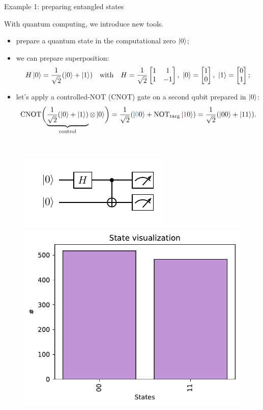 \documentclass[aspectratio=169, 8pt, xcolor={svgnames}, hyperref={linkcolor=black}]{beamer}
\begin{document}
\begin{frame}{Example 1: preparing entangled states}

With quantum computing, we introduce new tools.
\begin{itemize}[noitemsep]
\item[\faRocket] prepare a quantum state in the computational zero $\ket{0}$;
\item[\faSliders] we can prepare superposition: 
$$H\ket{0} = \frac{1}{\sqrt{2}}(\ket{0} + \ket{1})  \quad \text{with} \quad H = \frac{1}{\sqrt{2}}
\begin{bmatrix} 1 & 1 \\ 1 & -1 \end{bmatrix},\,\, \ket{0}=\begin{bmatrix} 1 \\ 0 
\end{bmatrix},\,\,\ket{1}=\begin{bmatrix} 0 \\ 1 \end{bmatrix};$$
\item[\faShareAlt] let's apply a controlled-NOT (CNOT) gate on a second qubit prepared in $\ket{0}$:
$$ \text{CNOT} \biggl( \underbrace{\frac{1}{\sqrt{2}}(\ket{0} + \ket{1})}_{\text{control}}\otimes 
\ket{0} \biggr) = \frac{1}{\sqrt{2}}(\ket{\textcolor{bleudefrance}{0}0} + 
\text{NOT}_{\rm targ}\ket{\textcolor{brightmaroon}{1}0}) = \frac{1}{\sqrt{2}}(\ket{00} + \ket{11}). $$
\end{itemize}
\pause
\begin{multicols}{2}
\texttt{\\}
\begin{figure}
   \includegraphics[width=.8\linewidth]{figures/baby3.pdf} %
   \includegraphics[width=.6\linewidth]{figures/bell.pdf} %
\end{figure}   
\end{multicols} 
\end{frame}
\end{document}
